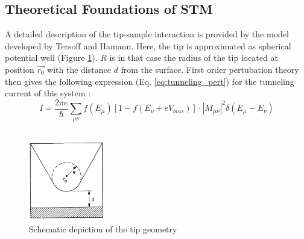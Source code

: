 \subsection{Theoretical Foundations of STM}

A detailed description of the tip-sample interaction is provided by the model developed by Tersoff and Hamann. \cite{PhysRevLett}
Here, the tip is approximated as spherical potential well (Figure \ref{fig:tip_scheme}). $R$ is in that case the radius of the tip located at position $\vec{r_0}$ with the distance $d$ from the surface.
First order pertubation theory then gives the following expression (Eq. \ref{eq:tunneling_pert}) for the tunneling current of this system :
\begin{equation}
    I = \frac{2 \pi e}{\hbar} \sum_{\mu \nu} f(E_{\mu})[1 - f(E_{\nu}+eV_{bias})]\cdot |M_{\mu \nu}|^2 \delta(E_{\mu}- E_{\nu})
    \label{eq:tunneling_pert}
\end{equation}\\

\begin{figure}
    \centering
    \includegraphics[width=0.3\textwidth]{graphics/fundamental_tip_sheme.PNG}
    \caption{Schematic depiction of the tip geometry \cite{PhysRevLett}}
    \label{fig:tip_scheme}
\end{figure}

